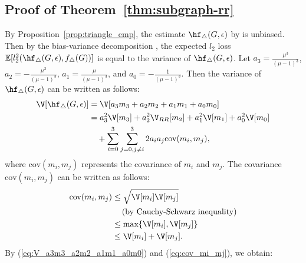 \subsection{Proof of Theorem~\ref{thm:subgraph-rr}}
\label{sub:proof_thm:subgraph-rr}
By Proposition~\ref{prop:triangle_emp}, the estimate $\hf_{\triangle}(G, \epsilon)$ by  is unbiased. 
Then by the bias-variance decomposition \cite{mlpp}, 
the expected $l_2$ loss $\mathbb{E}[l_2^2(\hf_{\triangle}(G, \epsilon), f_\triangle(G))]$ is equal to the variance of $\hf_{\triangle}(G, \epsilon)$. 
Let 
$a_3 = \frac{\mu^3}{(\mu-1)^3}$, 
$a_2 = - \frac{\mu^2}{(\mu-1)^3}$, 
$a_1 = \frac{\mu}{(\mu-1)^3}$, and 
$a_0 = - \frac{1}{(\mu-1)^3}$. 
Then the variance of $\hf_{\triangle}(G, \epsilon)$ can be written as follows:
\begin{align}
    \V[\hf_{\triangle}(G, \epsilon)] 
    &= \V[a_3 m_3 + a_2 m_2 + a_1 m_1 + a_0 m_0] \nonumber\\
    &= a_3^2 \V[m_3] + a_2^2 \V_{RR}[m_2] + a_1^2 \V[m_1] + a_0^2 \V[m_0] \nonumber\\
    &\hspace{3.5mm} + \sum_{i=0}^3 \sum_{j=0, j \ne i}^3 2a_i a_j \text{cov}(m_i, m_j),
    \label{eq:V_a3m3_a2m2_a1m1_a0m0}
\end{align}
where $\text{cov}(m_i, m_j)$ represents the covariance of $m_i$ and $m_j$. 
The covariance $\text{cov}(m_i, m_j)$ can be written as follows:
\begin{align}
    \text{cov}(m_i, m_j)
    &\leq \sqrt{\V[m_i] \V[m_j]} \nonumber\\
    &\hspace{4.2mm} (\text{by Cauchy-Schwarz inequality}) \nonumber\\
    &\leq  \max\{ \V[m_i], \V[m_j]\} \nonumber\\
    &\leq \V[m_i] + \V[m_j].
    \label{eq:cov_mi_mj}
\end{align}
By (\ref{eq:V_a3m3_a2m2_a1m1_a0m0}) and (\ref{eq:cov_mi_mj}), we obtain:
